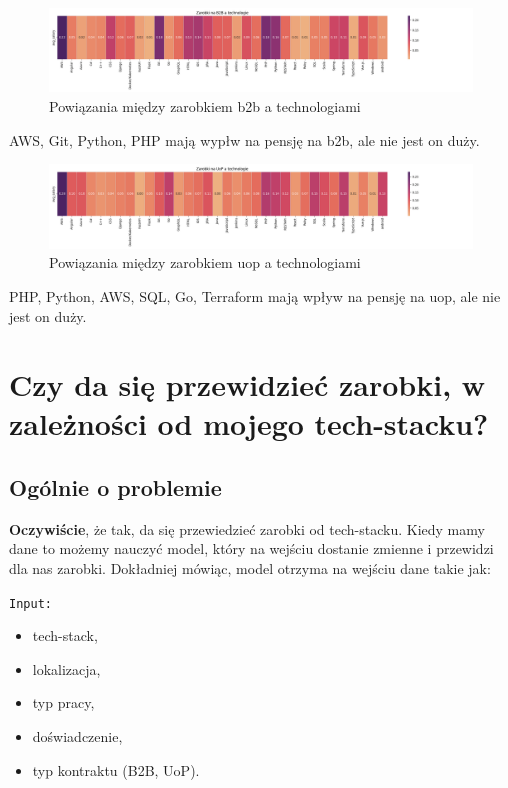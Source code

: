 \documentclass[a4paper]{article}
\begin{document}
\begin{figure}[H]
    \centering
    \includegraphics[width=\textwidth]{../analysis/plots/korelacje/zarobki_na_b2b_a_technologie.png}
    \caption{Powiązania między zarobkiem b2b a technologiami}
\end{figure}

\quad AWS, Git, Python, PHP mają wypłw na pensję na b2b, ale nie jest on duży.

\begin{figure}[H]
    \centering
    \includegraphics[width=\textwidth]{../analysis/plots/korelacje/zarobki_na_uop_a_technologie.png}
    \caption{Powiązania między zarobkiem uop a technologiami}
\end{figure}

\quad PHP, Python, AWS, SQL, Go, Terraform mają wpływ na pensję na uop, ale nie jest on duży.


\section{Czy da się przewidzieć zarobki, w zależności od mojego tech-stacku?}

\subsection{Ogólnie o problemie}

\quad \textbf{Oczywiście}, że tak, da się przewiedzieć zarobki od tech-stacku. Kiedy mamy dane to możemy nauczyć model, który na wejściu dostanie zmienne i przewidzi dla nas
zarobki. Dokładniej mówiąc, model otrzyma na wejściu dane takie jak:

\texttt{Input:}

\begin{itemize}
    \item tech-stack,
    \item lokalizacja,
    \item typ pracy,
    \item doświadczenie,
    \item typ kontraktu (B2B, UoP).
\end{itemize}
\end{document}
